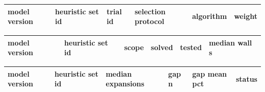 \begingroup
\setlength{\tabcolsep}{2pt}
\begin{longtable}{>{\raggedright\arraybackslash}p{}>{\raggedright\arraybackslash}p{}>{\raggedright\arraybackslash}p{}>{\raggedright\arraybackslash}p{}>{\raggedright\arraybackslash}p{}>{\raggedright\arraybackslash}p{}}
\hline
model version & heuristic set id & trial id & selection protocol & algorithm & weight \\ \hline\endhead
\hline
\end{longtable}
\endgroup
\begingroup
\setlength{\tabcolsep}{2pt}
\begin{longtable}{>{\raggedright\arraybackslash}p{}>{\raggedright\arraybackslash}p{}>{\raggedright\arraybackslash}p{}>{\raggedright\arraybackslash}p{}>{\raggedright\arraybackslash}p{}>{\raggedright\arraybackslash}p{}}
\hline
model version & heuristic set id & scope & solved & tested & median wall s \\ \hline\endhead
\hline
\end{longtable}
\endgroup
\begingroup
\setlength{\tabcolsep}{2pt}
\begin{longtable}{>{\raggedright\arraybackslash}p{}>{\raggedright\arraybackslash}p{}>{\raggedright\arraybackslash}p{}>{\raggedright\arraybackslash}p{}>{\raggedright\arraybackslash}p{}>{\raggedright\arraybackslash}p{}}
\hline
model version & heuristic set id & median expansions & gap n & gap mean pct & status \\ \hline\endhead
\hline
\end{longtable}
\endgroup
